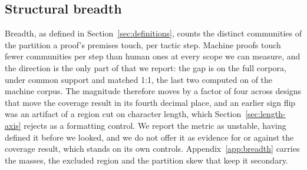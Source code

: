 
\subsection{Structural breadth}
\label{sec:breadth}

Breadth, as defined in Section~\ref{sec:definitions}, counts the distinct
communities of the partition a proof's premises touch, per tactic step. Machine
proofs touch fewer communities per step than human ones at every scope we can
measure, and the direction is the only part of that we report: the gap is
\breadthGapFull{} on the full corpora, \breadthGapSupport{} under common
support and \breadthGapMatched{} matched 1:1, the last two computed on
\supportRetentionMachine{} of the machine corpus. The magnitude therefore moves
by a factor of four across designs that move the coverage result in its fourth
decimal place, and an earlier sign flip was an artifact of a region cut on
character length, which Section~\ref{sec:length-axis} rejects as a formatting
control. We report the metric as unstable, having defined it before we looked,
and we do not offer it as evidence for or against the coverage result, which
stands on its own controls. Appendix~\ref{app:breadth} carries the masses, the
excluded region and the partition skew that keep it secondary.
